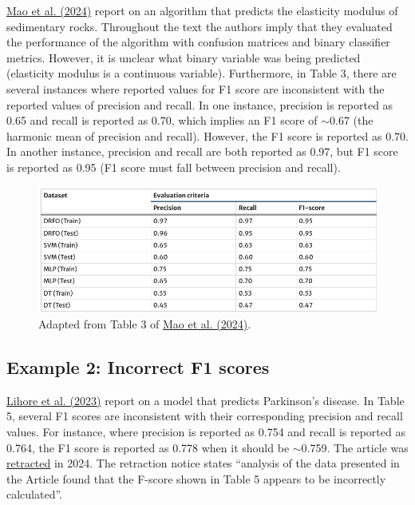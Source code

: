 \documentclass[letterpaper, 12pt]{article}
\begin{document}
\href{https://doi.org/10.1007/s12665-024-11768-y}{Mao et al. (2024)} report on an algorithm that predicts the elasticity modulus of sedimentary rocks. Throughout the text the authors imply that they evaluated the performance of the algorithm with confusion matrices and binary classifier metrics. However, it is unclear what binary variable was being predicted (elasticity modulus is a continuous variable). Furthermore, in Table 3, there are several instances where reported values for F1 score are inconsistent with the reported values of precision and recall. In one instance, precision is reported as 0.65 and recall is reported as 0.70, which implies an F1 score of $\sim$0.67 (the harmonic mean of precision and recall). However, the F1 score is reported as 0.70. In another instance, precision and recall are both reported as 0.97, but F1 score is reported as 0.95 (F1 score must fall between precision and recall).

\begin{figure}[h!tbp]
    \centering
    \includegraphics[width=\textwidth]{img/binary_classifiers/mao_et_al_table_3.png}
    \caption*{Adapted from Table 3 of \href{https://doi.org/10.1007/s12665-024-11768-y}{Mao et al. (2024)}.}
\end{figure}

\pagebreak

\subsection*{Example 2: Incorrect F1 scores}

\href{https://doi.org/10.1038/s41598-023-41314-y}{Lihore et al. (2023)} report on a model that predicts Parkinson's disease. In Table 5, several F1 scores are inconsistent with their corresponding precision and recall values. For instance, where precision is reported as 0.754 and recall is reported as 0.764, the F1 score is reported as 0.778 when it should be $\sim$0.759. The article was \href{https://doi.org/10.1038/s41598-024-78418-y}{retracted} in 2024. The retraction notice states ``analysis of the data presented in the Article found that the F-score shown in Table 5 appears to be incorrectly calculated''.
\end{document}
